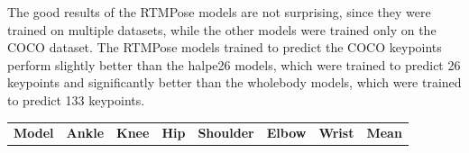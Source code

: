 The good results of the RTMPose models are not surprising, since they were trained on multiple datasets, while the other models were trained only on the COCO dataset. The RTMPose models trained to predict the COCO keypoints perform slightly better than the halpe26 models, which were trained to predict 26 keypoints and significantly better than the wholebody models, which were trained to predict 133 keypoints.

\begin{table}[htbp]
    \setlength{\tabcolsep}{4pt}

    \begin{tabular}{l ccccccc}
        \toprule
        \textbf{Model}                   & \textbf{Ankle} & \textbf{Knee} & \textbf{Hip}  & \textbf{Shoulder} & \textbf{Elbow} & \textbf{Wrist} & \textbf{Mean} \\


\end{tabular}
\end{table}
